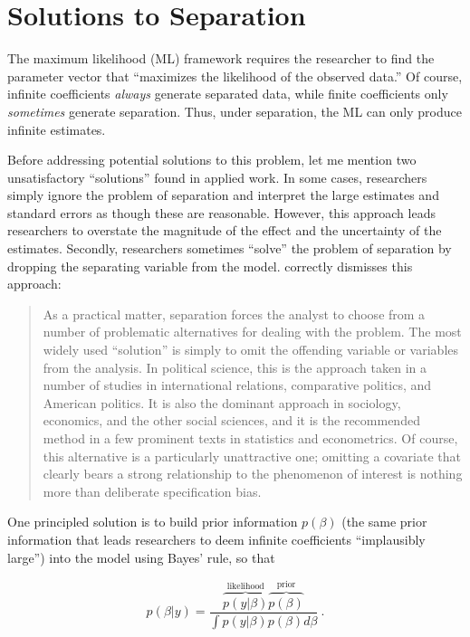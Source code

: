 \documentclass[12pt]{article}
\begin{document}
\section*{Solutions to Separation}

The maximum likelihood (ML) framework requires the researcher to find the parameter vector that ``maximizes the likelihood of the observed data.'' Of course, infinite coefficients \textit{always} generate separated data, while finite coefficients only \emph{sometimes} generate separation. Thus, under separation, the ML can only produce infinite estimates.

Before addressing potential solutions to this problem, let me mention two unsatisfactory ``solutions'' found in applied work. In some cases, researchers simply ignore the problem of separation and interpret the large estimates and standard errors as though these are reasonable. However, this approach leads researchers to overstate the magnitude of the effect and the uncertainty of the estimates. Secondly, researchers sometimes ``solve'' the problem of separation by dropping the separating variable from the model. \citet[pp. 161-162]{Zorn2005} correctly dismisses this approach:

\begin{quote}
As a practical matter, separation forces the analyst to choose from a number of problematic alternatives for dealing with the problem. The most widely used ``solution'' is simply to omit the offending variable or variables from the analysis. In political science, this is the approach taken in a number of studies in international relations, comparative politics, and American politics. It is also the dominant approach in sociology, economics, and the other social sciences, and it is the recommended method in a few prominent texts in statistics and econometrics. Of course, this alternative is a particularly unattractive one; omitting a covariate that clearly bears a strong relationship to the phenomenon of interest is nothing more than deliberate specification bias.
\end{quote}

One principled solution is to build prior information $p(\beta)$ (the same prior information that leads researchers to deem infinite coefficients ``implausibly large'') into the model using Bayes' rule, so that 

\begin{equation}\nonumber
p(\beta|y) = \dfrac{\overbrace{p(y|\beta)}^{\text{likelihood}}\overbrace{p(\beta)}^{\text{prior}}}{\int p(y|\beta)p(\beta) d\beta}~\text{.}
\end{equation}
\end{document}
